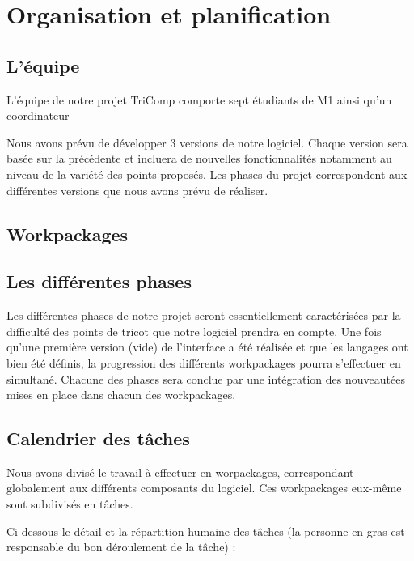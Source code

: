 \documentclass{article}
\begin{document}
\section{Organisation et planification}

\subsection{L'équipe}

L'équipe de notre projet TriComp comporte sept étudiants de M1 ainsi qu'un coordinateur

Nous avons prévu de développer 3 versions de notre logiciel. Chaque version sera basée sur la précédente et incluera de nouvelles fonctionnalités notamment au niveau de la variété des points proposés.
Les phases du projet correspondent aux différentes versions que nous avons prévu de réaliser.


\subsection{Workpackages}



\subsection{Les différentes phases}

Les différentes phases de notre projet seront essentiellement caractérisées par la difficulté des points de tricot que notre logiciel 
prendra en compte. 
Une fois qu'une première version (vide) de l'interface a été réalisée et que les langages ont bien été définis, la progression des
différents workpackages pourra s'effectuer en simultané. Chacune des phases sera conclue par une intégration des nouveautées mises en 
place dans chacun des workpackages.

\subsection{Calendrier des tâches}

Nous avons divisé le travail à effectuer en worpackages, correspondant globalement aux différents composants du logiciel. Ces workpackages eux-même sont subdivisés en tâches.

Ci-dessous le détail et la répartition humaine des tâches (la personne en gras est responsable du bon déroulement de la tâche) :
\end{document}
